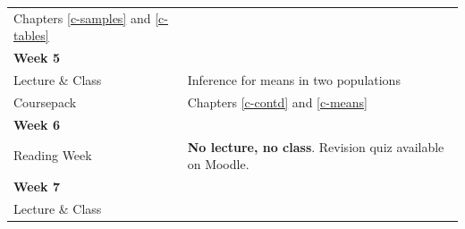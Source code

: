 \documentclass[11pt,a4paper,openany]{book}
\begin{document}
\begin{longtable}[]{@{}ll@{}}
\begin{minipage}[t]{0.76\columnwidth}
Chapters \ref{c-samples} and \ref{c-tables}\strut
\end{minipage}\tabularnewline
\begin{minipage}[t]{0.19\columnwidth}\raggedright\strut
\textbf{Week 5}\strut
\end{minipage} & \begin{minipage}[t]{0.76\columnwidth}\raggedright\strut
\strut
\end{minipage}\tabularnewline
\begin{minipage}[t]{0.19\columnwidth}\raggedright\strut
Lecture \& Class\strut
\end{minipage} & \begin{minipage}[t]{0.76\columnwidth}\raggedright\strut
Inference for means in two populations\strut
\end{minipage}\tabularnewline
\begin{minipage}[t]{0.19\columnwidth}\raggedright\strut
Coursepack\strut
\end{minipage} & \begin{minipage}[t]{0.76\columnwidth}\raggedright\strut
Chapters \ref{c-contd} and \ref{c-means}\strut
\end{minipage}\tabularnewline
\begin{minipage}[t]{0.19\columnwidth}\raggedright\strut
\textbf{Week 6}\strut
\end{minipage} & \begin{minipage}[t]{0.76\columnwidth}\raggedright\strut
\strut
\end{minipage}\tabularnewline
\begin{minipage}[t]{0.19\columnwidth}\raggedright\strut
Reading Week\strut
\end{minipage} & \begin{minipage}[t]{0.76\columnwidth}\raggedright\strut
\textbf{No lecture, no class}. Revision quiz available on Moodle.\strut
\end{minipage}\tabularnewline
\begin{minipage}[t]{0.19\columnwidth}\raggedright\strut
\textbf{Week 7}\strut
\end{minipage} & \begin{minipage}[t]{0.76\columnwidth}\raggedright\strut
\strut
\end{minipage}\tabularnewline
\begin{minipage}[t]{0.19\columnwidth}\raggedright\strut
Lecture \& Class\strut
\end{minipage} & \begin{minipage}[t]{0.76\columnwidth}\raggedright\strut

\end{minipage}
\end{longtable}
\end{document}
